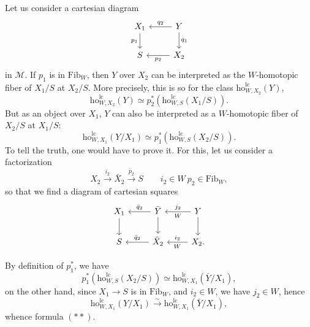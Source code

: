 \documentclass[11pt]{article}
\newcommand{\printedpage}[1]{\marginpar{\footnotesize p.~#1}}
\newcommand{\msp}[1]{\marginpar{\footnotesize [#1]}}
\newcommand{\ho}{\mathrm{ho}}
\newcommand{\lc}{\mathrm{lc}}
\begin{document}
Let us consider a cartesian diagram
\[
\begin{tikzcd}[ampersand replacement=\&]
X_1 \arrow[d, "p_1"'] \& Y \arrow[l, "q_2"'] \arrow[d, "q_1"] \\
S \& X_2 \arrow[l, "p_2"]
\end{tikzcd}
\]
\printedpage{156}
in $\mathcal{M}$. If $p_1$ is in $\mathrm{Fib}_W$, then $Y$ over $X_2$ can be interpreted as the $W$-homotopic fiber of $X_1/S$ at $X_2/S$. More precisely, this is so for the class $\ho^{\lc}_{W,X_2}(Y)$,
\[
\ho^{\lc}_{W,X_2}(Y) \simeq p_2^*(\ho^{\lc}_{W,S}(X_1/S)). \tag*{$(*)$}
\]
But as an object over $X_1$, $Y$ can also be interpreted as a $W$-homotopic fiber of $X_2/S$ at $X_1/S$:
\[
\ho^{\lc}_{W,X_1}(Y/X_1) \simeq p_1^*(\ho^{\lc}_{W,S}(X_2/S)). \tag*{$(**)$}
\]
To tell the truth, one would have to prove it. For this, let us consider a factorization
\[
X_2 \xrightarrow{i_2} \bar{X}_2 \xrightarrow{\bar{p}_2} S \qquad i_2 \in W\ p_2 \in \mathrm{Fib}_W, %
\]
so that we find a diagram of cartesian squares
\[
\begin{tikzcd}[ampersand replacement=\&]
X_1 \arrow[d] \& \bar{Y} \arrow[l, "\bar{q}_2"'] \arrow[d] \& Y \arrow[l, "j_2"', "W"] \arrow[d] \\
S \& \bar{X}_2 \arrow[l, "\bar{q}_2"'] \& X_2. \arrow[l, "i_2"', "W"] %
\end{tikzcd}
\]

\msp{page 242}
By definition of $p_1^*$, we have
\[
p_1^*(\ho^{\lc}_{W,S}(X_2/S)) \simeq \ho^{\lc}_{W,X_1}(\bar{Y}/X_1),
\]
on the other hand, since $X_1 \longrightarrow S$ is in $\mathrm{Fib}_W$, and $i_2 \in W$, we have $j_2 \in W$, hence
\[
\ho^{\lc}_{W,X_1}(Y/X_1) \xrightarrow{\sim} \ho^{\lc}_{W,X_1}(\bar{Y}/X_1),
\]
whence formula $(**)$.
\end{document}
